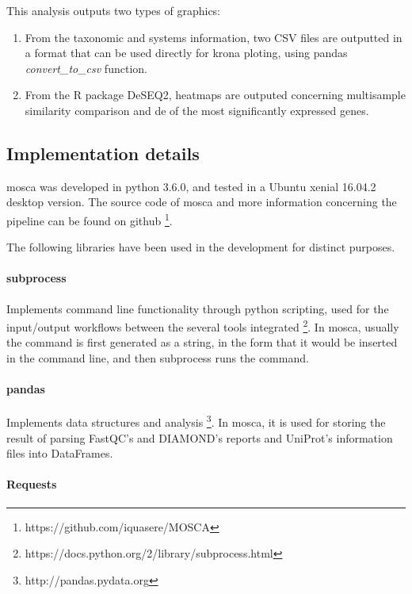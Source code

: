 \documentclass[
  oneside,
  11pt, a4paper,
  footinclude=true,
  headinclude=true,
  cleardoublepage=empty
]{scrbook}
\begin{document}
    This analysis outputs two types of graphics:
    \begin{enumerate}
        \item From the taxonomic and systems information, two CSV files are outputted in a format that can be used directly for krona ploting, using pandas \textit{convert\_to\_csv} function.
        \item From the R package DeSEQ2, heatmaps are outputed concerning multisample similarity comparison and \gls{de} of the most significantly expressed genes.
    \end{enumerate}
    
    \subsection{Implementation details}
    
    \gls{mosca} was developed in python 3.6.0, and tested in a Ubuntu xenial 16.04.2 desktop version.
    The source code of \gls{mosca} and more information concerning the pipeline can be found on github \footnote{https://github.com/iquasere/MOSCA}.

    The following libraries have been used in the development for distinct purposes.
    
    \paragraph{subprocess}
    
    Implements command line functionality through python scripting, used for the input/output workflows between the several tools integrated \footnote{https://docs.python.org/2/library/subprocess.html}. In \gls{mosca}, usually the command is first generated as a string, in the form that it would be inserted in the command line, and then subprocess runs the command.
    
    \paragraph{pandas}
    
    Implements data structures and analysis \footnote{http://pandas.pydata.org}. In \gls{mosca}, it is used for storing the result of parsing FastQC's and DIAMOND's reports and UniProt's information files into DataFrames.
    
    \paragraph{Requests}
    
\end{document}
